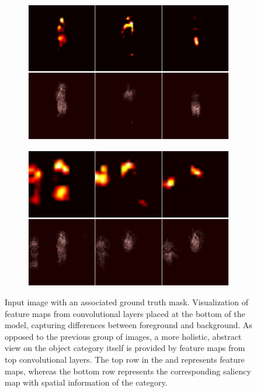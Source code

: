 \begin{figure}[t]
\begin{subfigure}[b]{0.13\textwidth}
        \caption[]{}
    \end{subfigure}
    \hfill
    \begin{subfigure}[b]{0.39\textwidth}
        \centering
        \includegraphics[width=\textwidth]{figures/theoretical_foundations/fully_cnn_tracking_feature_maps_2.pdf}
        \caption[]{}
    \end{subfigure}
    \hfill
    \begin{subfigure}[b]{0.39\textwidth}
        \centering
        \includegraphics[width=\textwidth]{figures/theoretical_foundations/fully_cnn_tracking_feature_maps_3.pdf}
        \caption[]{}
    \end{subfigure}
    \caption[Fully convolutional tracking]{ Input image with an associated ground truth mask.  Visualization of feature maps from convolutional layers placed at the bottom of the model, capturing differences between foreground and background.  As opposed to the previous group of images, a more holistic, abstract view on the object category itself is provided by feature maps from top convolutional layers. The top row in the  and  represents feature maps, whereas the bottom row represents the corresponding saliency map with spatial information of the category. }
    \label{fig:FullyCNNTrackingFeatureMaps}
\end{figure}

